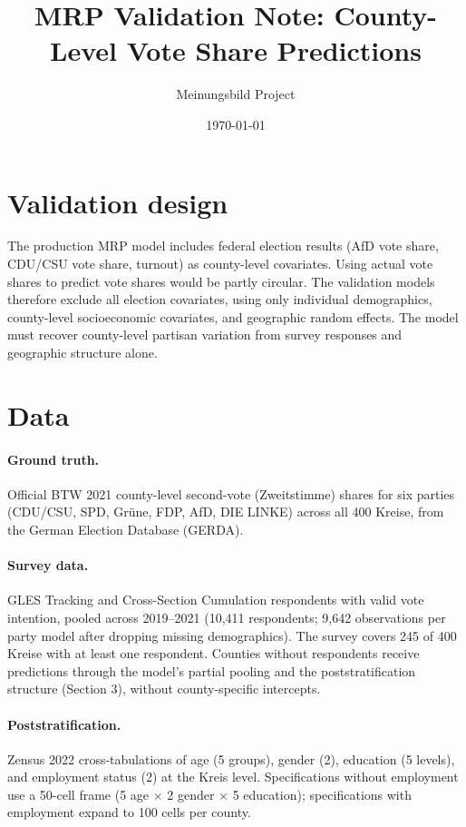 \documentclass[11pt]{article}
\title{MRP Validation Note: County-Level Vote Share Predictions}
\author{Meinungsbild Project}
\date{\today}
\begin{document}
\maketitle

\section{Validation design}

The production MRP model includes federal election results (AfD vote share, CDU/CSU vote share, turnout) as county-level covariates. Using actual vote shares to predict vote shares would be partly circular. The validation models therefore exclude all election covariates, using only individual demographics, county-level socioeconomic covariates, and geographic random effects. The model must recover county-level partisan variation from survey responses and geographic structure alone.

\section{Data}

\paragraph{Ground truth.} Official BTW 2021 county-level second-vote (Zweitstimme) shares for six parties (CDU/CSU, SPD, Gr\"une, FDP, AfD, DIE LINKE) across all 400 Kreise, from the German Election Database (GERDA).

\paragraph{Survey data.} GLES Tracking and Cross-Section Cumulation respondents with valid vote intention, pooled across 2019--2021 (10,411 respondents; 9,642 observations per party model after dropping missing demographics). The survey covers 245 of 400 Kreise with at least one respondent. Counties without respondents receive predictions through the model's partial pooling and the poststratification structure (Section 3), without county-specific intercepts.

\paragraph{Poststratification.} Zensus 2022 cross-tabulations of age (5 groups), gender (2), education (5 levels), and employment status (2) at the Kreis level. Specifications without employment use a 50-cell frame (5 age $\times$ 2 gender $\times$ 5 education); specifications with employment expand to 100 cells per county.
\end{document}
